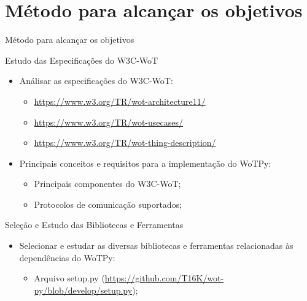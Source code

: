 \section{Método para alcançar os objetivos}

\begin{frame}{Método para alcançar os objetivos}

    \begin{block}{Estudo das Especificações do W3C-WoT}
        \begin{itemize}
            \item Análisar as especificações do W3C-WoT:
            \begin{itemize}
                \item \url{https://www.w3.org/TR/wot-architecture11/}
                \item \url{https://www.w3.org/TR/wot-usecases/}
                \item \url{https://www.w3.org/TR/wot-thing-description/}
            \end{itemize}
            \item Principais conceitos e requisitos para a implementação do WoTPy:
            \begin{itemize}
                \item Principais componentes do W3C-WoT;
                \item Protocolos de comunicação suportados;
            \end{itemize}
        \end{itemize}
    \end{block}

    \begin{block}{Seleção e Estudo das Bibliotecas e Ferramentas}
        \begin{itemize}
            \item Selecionar e estudar as diversas bibliotecas e ferramentas relacionadas às dependências do WoTPy:
            \begin{itemize}
                \item Arquivo setup.py (\url{https://github.com/T16K/wot-py/blob/develop/setup.py});
            \end{itemize}
        \end{itemize}
    \end{block}

\end{frame}

